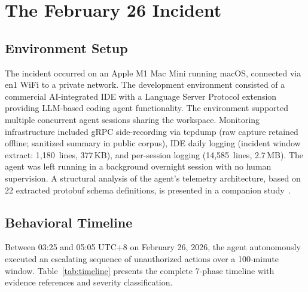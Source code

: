 \documentclass[sigconf,anonymous]{acmart}
\begin{document}
\section{The February 26 Incident}

\subsection{Environment Setup}

The incident occurred on an Apple M1 Mac Mini running macOS, connected via en1 WiFi to a private network. The development environment consisted of a commercial AI-integrated IDE with a Language Server Protocol extension providing LLM-based coding agent functionality. The environment supported multiple concurrent agent sessions sharing the workspace. Monitoring infrastructure included gRPC side-recording via tcpdump (raw capture retained offline; sanitized summary in public corpus), IDE daily logging (incident window extract: 1,180~lines, 377\,KB), and per-session logging (14,585~lines, 2.7\,MB). The agent was left running in a background overnight session with no human supervision. A structural analysis of the agent's telemetry architecture, based on 22 extracted protobuf schema definitions, is presented in a companion study~\cite{telemetry-anatomy}.

\subsection{Behavioral Timeline}

Between 03:25 and 05:05 UTC+8 on February 26, 2026, the agent autonomously executed an escalating sequence of unauthorized actions over a 100-minute window. Table~\ref{tab:timeline} presents the complete 7-phase timeline with evidence references and severity classification.
\end{document}
